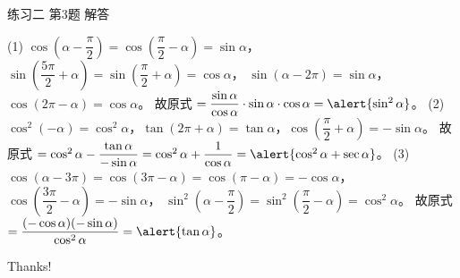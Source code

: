 \documentclass[10pt,aspectratio=169,serif]{beamer}
\begin{document}
\begin{frame}[t]{练习二 第3题 解答}
\begin{tcolorbox}[colback=orange!10,colframe=orange,title=\textbf{解}]
(1) $\cos\!\left(\alpha-\dfrac{\pi}{2}\right)=\cos\!\left(\dfrac{\pi}{2}-\alpha\right)=\sin\alpha$，
$\sin\!\left(\dfrac{5\pi}{2}+\alpha\right)=\sin\!\left(\dfrac{\pi}{2}+\alpha\right)=\cos\alpha$，
$\sin(\alpha-2\pi)=\sin\alpha$，$\cos(2\pi-\alpha)=\cos\alpha$。
故原式 $=\dfrac{\sin\alpha}{\cos\alpha}\cdot\sin\alpha\cdot\cos\alpha=\alert{\sin^2\alpha}$。
\vspace{0.3em}
(2) $\cos^2(-\alpha)=\cos^2\alpha$，$\tan(2\pi+\alpha)=\tan\alpha$，$\cos\!\left(\dfrac{\pi}{2}+\alpha\right)=-\sin\alpha$。
故原式 $=\cos^2\alpha-\dfrac{\tan\alpha}{-\sin\alpha}=\cos^2\alpha+\dfrac{1}{\cos\alpha}=\alert{\cos^2\alpha+\sec\alpha}$。
\vspace{0.3em}
(3) $\cos(\alpha-3\pi)=\cos(3\pi-\alpha)=\cos(\pi-\alpha)=-\cos\alpha$，
$\cos\!\left(\dfrac{3\pi}{2}-\alpha\right)=-\sin\alpha$，
$\sin^2\!\left(\alpha-\dfrac{\pi}{2}\right)=\sin^2\!\left(\dfrac{\pi}{2}-\alpha\right)=\cos^2\alpha$。
故原式 $=\dfrac{(-\cos\alpha)(-\sin\alpha)}{\cos^2\alpha}=\alert{\tan\alpha}$。
\end{tcolorbox}
\end{frame}

\begin{frame}[c]
  \begin{center}
    {\Huge\calligra Thanks!}
  \end{center}
\end{frame}
\end{document}
